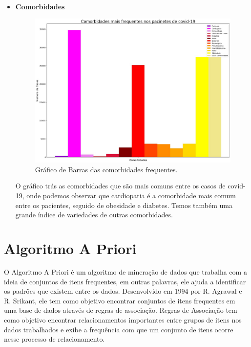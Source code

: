 \documentclass[tcc1]{uftex}
\begin{document}
\begin{itemize}
    \item\textbf{Comorbidades}
    \begin{figure}[h]
    \centering
    \includegraphics[width=11cm]{Comorbidade_solo.jpg} %
    \caption{Gráfico de Barras das comorbidades frequentes.}
    \end{figure}
    
    O gráfico trás as comorbidades que são mais comuns entre os casos de covid-19, onde podemos observar que cardiopatia é a comorbidade mais comum entre os pacientes, seguido de obesidade e diabetes. Temos também uma grande índice de variedades de outras comorbidades. 
    
 
 
 \end{itemize}


    
\chapter{Algoritmo A Priori}

O Algoritmo A Priori é um algoritmo de mineração de dados que trabalha com a ideia de conjuntos de itens frequentes, em outras palavras, ele ajuda a identificar os padrões que existem entre os dados. Desenvolvido em 1994 por R. Agrawal e R. Srikant, ele tem como objetivo encontrar conjuntos de itens frequentes em uma base de dados através de regras de associação. Regras de Associação tem como objetivo encontrar relacionamentos importantes entre grupos de itens nos dados trabalhados e exibe a frequência com que um conjunto de itens ocorre nesse processo de relacionamento.\cite{liu2010study}
\end{document}

